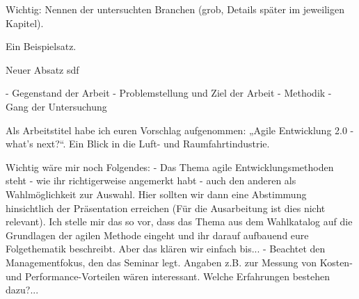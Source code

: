 Wichtig: Nennen der untersuchten Branchen (grob, Details später im jeweiligen Kapitel).


Ein Beispielsatz. \parencite[Vgl.][S. 20]{Thompson:1984:RTT:358198.358210}

Neuer Absatz sdf

- Gegenstand der Arbeit
- Problemstellung und Ziel der Arbeit 
- Methodik
- Gang der Untersuchung

Als Arbeitstitel habe ich euren Vorschlag aufgenommen: „Agile Entwicklung 2.0 - what's next?“. Ein Blick in die Luft- und Raumfahrtindustrie.

Wichtig wäre mir noch Folgendes: 
- Das Thema agile Entwicklungsmethoden steht - wie ihr richtigerweise angemerkt habt - auch den anderen als Wahlmöglichkeit zur Auswahl. Hier sollten wir dann eine Abstimmung hinsichtlich der Präsentation erreichen (Für die Ausarbeitung ist dies nicht relevant). Ich stelle mir das so vor, dass das Thema aus dem Wahlkatalog auf die Grundlagen der agilen Methode eingeht und ihr darauf aufbauend eure Folgethematik beschreibt. Aber das klären wir einfach bis...
- Beachtet den Managementfokus, den das Seminar legt. Angaben z.B. zur Messung von Kosten- und Performance-Vorteilen wären interessant. Welche Erfahrungen bestehen dazu?...